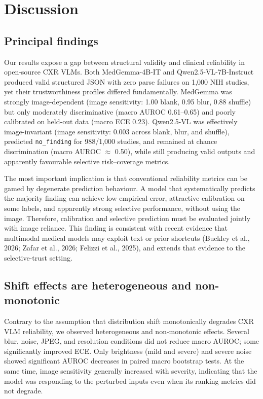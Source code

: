 \section{Discussion}

\subsection{Principal findings}

Our results expose a gap between structural validity and clinical reliability in open-source CXR VLMs. Both MedGemma-4B-IT and Qwen2.5-VL-7B-Instruct produced valid structured JSON with zero parse failures on 1,000 NIH studies, yet their trustworthiness profiles differed fundamentally. MedGemma was strongly image-dependent (image sensitivity: 1.00 blank, 0.95 blur, 0.88 shuffle) but only moderately discriminative (macro AUROC 0.61--0.65) and poorly calibrated on held-out data (macro ECE 0.23). Qwen2.5-VL was effectively image-invariant (image sensitivity: 0.003 across blank, blur, and shuffle), predicted \texttt{no\_finding} for 988/1,000 studies, and remained at chance discrimination (macro AUROC $\approx$ 0.50), while still producing valid outputs and apparently favourable selective risk--coverage metrics.

The most important implication is that conventional reliability metrics can be gamed by degenerate prediction behaviour. A model that systematically predicts the majority finding can achieve low empirical error, attractive calibration on some labels, and apparently strong selective performance, without using the image. Therefore, calibration and selective prediction must be evaluated jointly with image reliance. This finding is consistent with recent evidence that multimodal medical models may exploit text or prior shortcuts (Buckley et al., 2026; Zafar et al., 2026; Felizzi et al., 2025), and extends that evidence to the selective-trust setting.

\subsection{Shift effects are heterogeneous and non-monotonic}

Contrary to the assumption that distribution shift monotonically degrades CXR VLM reliability, we observed heterogeneous and non-monotonic effects. Several blur, noise, JPEG, and resolution conditions did not reduce macro AUROC; some significantly improved ECE. Only brightness (mild and severe) and severe noise showed significant AUROC decreases in paired macro bootstrap tests. At the same time, image sensitivity generally increased with severity, indicating that the model was responding to the perturbed inputs even when its ranking metrics did not degrade.

